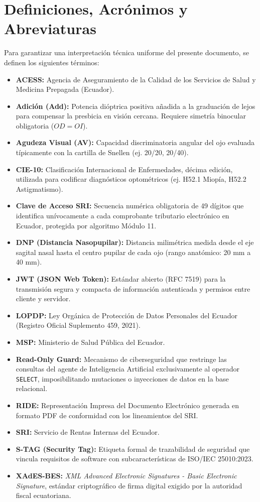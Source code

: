 \documentclass[12pt,a4paper]{report}
\begin{document}
\section{Definiciones, Acrónimos y Abreviaturas}
Para garantizar una interpretación técnica uniforme del presente documento, se definen los siguientes términos:
\begin{itemize}
    \item \textbf{ACESS:} Agencia de Aseguramiento de la Calidad de los Servicios de Salud y Medicina Prepagada (Ecuador).
    \item \textbf{Adición (Add):} Potencia dióptrica positiva añadida a la graduación de lejos para compensar la presbicia en visión cercana. Requiere simetría binocular obligatoria ($OD = OI$).
    \item \textbf{Agudeza Visual (AV):} Capacidad discriminatoria angular del ojo evaluada típicamente con la cartilla de Snellen (ej. 20/20, 20/40).
    \item \textbf{CIE-10:} Clasificación Internacional de Enfermedades, décima edición, utilizada para codificar diagnósticos optométricos (ej. H52.1 Miopía, H52.2 Astigmatismo).
    \item \textbf{Clave de Acceso SRI:} Secuencia numérica obligatoria de 49 dígitos que identifica unívocamente a cada comprobante tributario electrónico en Ecuador, protegida por algoritmo Módulo 11.
    \item \textbf{DNP (Distancia Nasopupilar):} Distancia milimétrica medida desde el eje sagital nasal hasta el centro pupilar de cada ojo (rango anatómico: 20 mm a 40 mm).
    \item \textbf{JWT (JSON Web Token):} Estándar abierto (RFC 7519) para la transmisión segura y compacta de información autenticada y permisos entre cliente y servidor.
    \item \textbf{LOPDP:} Ley Orgánica de Protección de Datos Personales del Ecuador (Registro Oficial Suplemento 459, 2021).
    \item \textbf{MSP:} Ministerio de Salud Pública del Ecuador.
    \item \textbf{Read-Only Guard:} Mecanismo de ciberseguridad que restringe las consultas del agente de Inteligencia Artificial exclusivamente al operador \texttt{SELECT}, imposibilitando mutaciones o inyecciones de datos en la base relacional.
    \item \textbf{RIDE:} Representación Impresa del Documento Electrónico generada en formato PDF de conformidad con los lineamientos del SRI.
    \item \textbf{SRI:} Servicio de Rentas Internas del Ecuador.
    \item \textbf{S-TAG (Security Tag):} Etiqueta formal de trazabilidad de seguridad que vincula requisitos de software con subcaracterísticas de ISO/IEC 25010:2023.
    \item \textbf{XAdES-BES:} \textit{XML Advanced Electronic Signatures - Basic Electronic Signature}, estándar criptográfico de firma digital exigido por la autoridad fiscal ecuatoriana.
\end{itemize}
\end{document}
